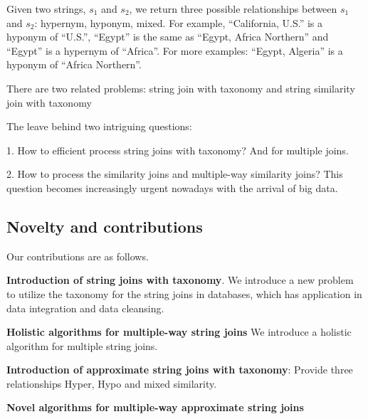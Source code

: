 \documentclass{sig-alternate}
\newtheorem{problem}[theorem]{Problem}
\begin{document}
Given two strings, $s_1$ and $s_2$, we return three possible relationships between $s_1$ and $s_2$: hypernym, hyponym, mixed. For example, ``California, U.S.'' is a hyponym of ``U.S.'', ``Egypt'' is the same as ``Egypt, Africa Northern'' and ``Egypt'' is a hypernym of ``Africa''. For more examples: ``Egypt, Algeria'' is a hyponym of ``Africa Northern''.

There are two related problems: string join with taxonomy and string similarity join with taxonomy

The leave behind two intriguing questions:

1. How to efficient process string joins with taxonomy? And for multiple joins.


2. How to process the similarity joins and multiple-way similarity joins?  This question becomes increasingly urgent nowadays with the arrival of big data.





\subsection{Novelty and contributions}


\smallskip


Our contributions are as follows.

\noindent \textbf{Introduction of string joins with taxonomy}. We introduce a new problem to utilize the taxonomy for the string joins in databases, which has application in data integration and data cleansing.

\noindent \textbf{Holistic algorithms for multiple-way string joins} We introduce a holistic algorithm for multiple string joins.

\noindent \textbf{Introduction of approximate string joins with taxonomy}: Provide three relationships Hyper, Hypo and mixed similarity.

\noindent \textbf{Novel algorithms for multiple-way approximate string joins}
\end{document}

